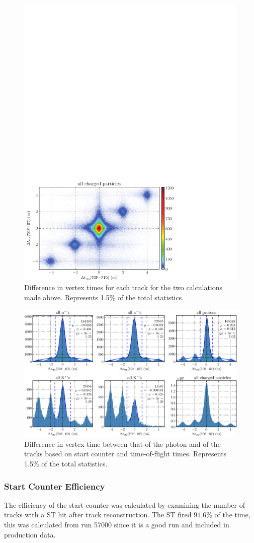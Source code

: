 \begin{figure}[htbp]\begin{center}
\includegraphics[width=0.5\columnwidth]{figures/calib/st/dvertex_time_pid_st.pdf}
\caption[vertex timing,  vs.\ ]{\label{fig:dvertex_time_pid_st}Difference in vertex times for each track for the two calculations made above. Represents 1.5\% of the total statistics.}
\end{center}\end{figure}

\begin{figure}[htbp]\begin{center}
\includegraphics[width=0.9\columnwidth]{figures/calib/st/dvertex_time_st.eps}
\caption[vertex timing, ]{\label{fig:dvertex_time_st}Difference in vertex time between that of the photon and of the tracks based on start counter and time-of-flight times. Represents 1.5\% of the total statistics.}
\end{center}\end{figure}


\subsubsection{\label{sec:calib.st.eff}Start Counter Efficiency}

The efficiency of the start counter was calculated by examining the number of tracks with a ST hit after track reconstruction. The ST fired $91.6\%$ of the time, this was calculated from run 57000 since it is a good run and included in production data.

\FloatBarrier
